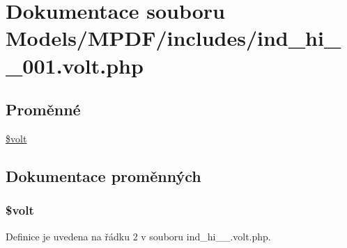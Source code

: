 \hypertarget{ind__hi__1__001_8volt_8php}{\section{Dokumentace souboru Models/\-M\-P\-D\-F/includes/ind\-\_\-hi\-\_\-\_\-001.volt.\-php}
\label{ind__hi__1__001_8volt_8php}
}
\subsection*{Proměnné}
\begin{DoxyCompactItemize}
\item 
\hyperlink{ind__hi__1__001_8volt_8php_a013d9bcd621d002433e25a82dd593989}{\$volt}
\end{DoxyCompactItemize}


\subsection{Dokumentace proměnných}
\hypertarget{ind__hi__1__001_8volt_8php_a013d9bcd621d002433e25a82dd593989}{
\subsubsection[{\$volt}]{\setlength{\rightskip}{0pt plus 5cm}\$volt}}\label{ind__hi__1__001_8volt_8php_a013d9bcd621d002433e25a82dd593989}


Definice je uvedena na řádku 2 v souboru ind\-\_\-hi\-\_\-\_.\-volt.\-php.

